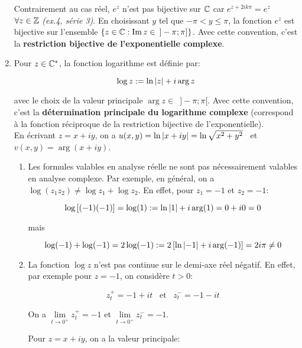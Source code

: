\begin{example}
\begin{enumerate}[label=\arabic{enumi})]
    \begin{remark}
    Contrairement au cas réel, $e^z$ n'est pas bijective sur $\mathbb{C}$ car $e^{z + 2ik\pi} = e^z$ $\forall z \in \mathbb{Z}$ \textit{(ex.4, série 3)}.
    En choisissant $y$ tel que $-\pi < y \leq \pi$, la fonction $e^z$ est bijective sur l'ensemble $\left\{z \in \mathbb{C} : \operatorname{Im} z \in \enspace ] -\pi; \pi]\right\}$.
    Avec cette convention, c'est la \textbf{\og restriction bijective de l'exponentielle complexe\fg{}}.
    \end{remark}

    \item 
    Pour $z \in \mathbb{C}^*$, la fonction logarithme est définie par:
    
    \[
    \log z := \ln \left|z\right| + i \arg z
    \]
    
    avec le choix de la valeur principale $\arg z \in \enspace ]-\pi;\pi[$. Avec cette convention, c'est la \textbf{\og détermination principale du logarithme complexe \fg} (correspond à la fonction réciproque de la restriction bijective de l'exponentielle).\\
    En écrivant $z = x + iy$, on a $u(x,y) = \ln \left|x + iy\right| = \ln \sqrt{x^2 + y^2} \enspace$ et $v(x,y)= \arg (x + iy)$.
    
    \begin{remark}\hfill
    \begin{enumerate}[label=\alph*)]
    \item 
    Les formules valables en analyse réelle ne sont pas nécessairement valables en analyse complexe.
    Par exemple, en général, on a $\log(z_1 z_2) \neq \log z_1 + \log z_2$.
    En effet, pour $z_1 = -1$ et $z_2 = -1$:
    
    \[\log\left[(-1)(-1)\right] = \log(1) := \ln \left|1\right| + i \arg(1) = 0 + i0 = 0\]
    
    mais
    
    \[\log(-1) + \log(-1) = 2 \log(-1) := 2 \left[\ln \left|-1\right| + i \arg (-1) \right] = 2i\pi \neq 0 \]
    
    \item 
    La fonction $\log z$ n'est pas continue sur le demi-axe réel négatif.
    En effet, par exemple pour $z = -1$, on considère $t > 0$:
    
    \[z^+_t = -1 + it \enspace \textrm{ et }\enspace
     z^-_t = -1 - it \]
     
    On a $\lim\limits_{t \rightarrow 0^+} z^+_t = -1$ et $\lim\limits_{t \rightarrow 0^+} z^-_t = -1$.

    \begin{note}
    Pour $z = x + iy$, on a la valeur principale:
    

\end{note}
\end{enumerate}
\end{remark}
\end{enumerate}
\end{example}
